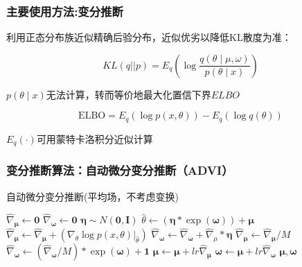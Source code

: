 \documentclass{beamer}
\begin{document}
\begin{frame}

\frametitle{主要使用方法:变分推断}

利用正态分布族近似精确后验分布，近似优劣以降低KL散度为准：

$$
KL(q||p) = E_q \left( \log \frac{q(\theta \mid \mu,\omega)}{p(\theta \mid x)} \right)
$$

$p(\theta \mid x)$无法计算，转而等价地最大化置信下界$ELBO$

$$
\mathrm{ELBO} = E_q (\log p(x,\theta)) - E_q(\log q(\theta)) 
$$

$E_q(\cdot)$可用蒙特卡洛积分近似计算

\end{frame}

\begin{frame}
\frametitle{变分推断算法：自动微分变分推断（ADVI）}

\begin{algorithm}[H]

\tiny

\caption{自动微分变分推断(平均场，不考虑变换)}
\begin{algorithmic}[1]
  
        \State $\hat{\nabla}_\mathbf{\mu} \gets \mathbf{0}$
        \State $\hat{\nabla}_\mathbf{\omega} \gets \mathbf{0}$
            \State $\mathbf{\eta} \sim N(\mathbf{0},\mathbf{I}) $ 
            \State $\hat{\theta} \gets (\mathbf{\eta} * \exp(\mathbf{\omega})) + \mathbf{\mu}$ 
            \State $\hat{\nabla}_\mathbf{\mu} \gets \hat{\nabla}_\mathbf{\mu} + (\nabla_\theta \log p(x,\theta)|_{\hat{\theta}})$
            \State $\hat{\nabla}_\mathbf{\omega} \gets \hat{\nabla}_\mathbf{\omega} + \hat{\nabla}_\mu * \mathbf{\eta}$
        \EndFor
        \State $\hat{\nabla}_{\mathbf{\mu}} \gets \hat{\nabla}_{\mathbf{\mu}} / M$
        \State $\hat{\nabla}_{\mathbf{\omega}} \gets (\hat{\nabla}_\mathbf{\omega} / M) * \exp(\mathbf{\omega}) + \mathbf{1}$
        \State $\mathbf{\mu} \gets \mathbf{\mu} + lr \hat{\nabla}_{\mathbf{\mu}}$
        \State $\mathbf{\omega} \gets \mathbf{\mu} + lr \hat{\nabla}_{\mathbf{\omega}}$
    \EndFor 
    \State \Return $\mathbf{\mu},\mathbf{\omega}$
\EndProcedure
\end{algorithmic}
\label{alg:advi}
\end{algorithm}

\end{frame}
\end{document}
